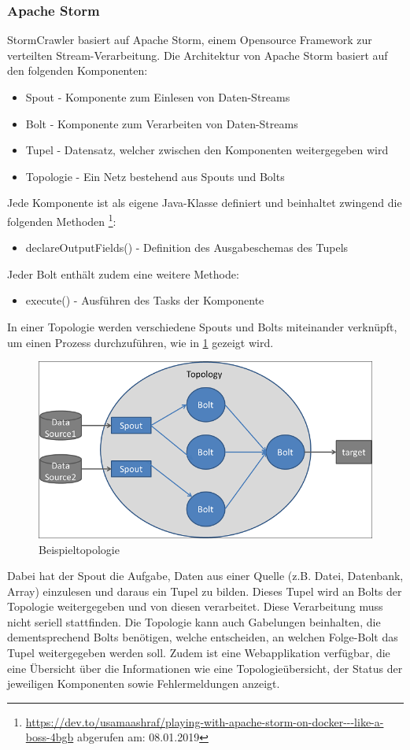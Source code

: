 \subsubsection{Apache Storm}
StormCrawler basiert auf Apache Storm, einem Opensource Framework zur verteilten Stream-Verarbeitung.
Die Architektur von Apache Storm basiert auf den folgenden Komponenten:
\begin{itemize}
	\item Spout - Komponente zum Einlesen von Daten-Streams
	\item Bolt - Komponente zum Verarbeiten von Daten-Streams
	\item Tupel - Datensatz, welcher zwischen den Komponenten weitergegeben wird
	\item Topologie - Ein Netz bestehend aus Spouts und Bolts
\end{itemize}
Jede Komponente ist als eigene Java-Klasse definiert und beinhaltet zwingend die folgenden Methoden \footnote{\url{https://dev.to/usamaashraf/playing-with-apache-storm-on-docker---like-a-boss-4bgb} abgerufen am: 08.01.2019}:
\begin{itemize}
	\item declareOutputFields() - Definition des Ausgabeschemas des Tupels
\end{itemize}
Jeder Bolt enthält zudem eine weitere Methode:
\begin{itemize}
	\item execute() - Ausführen des Tasks der Komponente
\end{itemize}
In einer Topologie werden verschiedene Spouts und Bolts miteinander verknüpft, um einen Prozess durchzuführen, wie in \cref{fig:topology} gezeigt wird.
\begin{figure}[H]
	\centering	
	\includegraphics[width=0.8\columnwidth,keepaspectratio]{img/storm-topology.png}
	\caption{Beispieltopologie}
	\label{fig:topology}
\end{figure}
Dabei hat der Spout die Aufgabe, Daten aus einer Quelle (z.B. Datei, Datenbank, Array) einzulesen und daraus ein Tupel zu bilden.
Dieses Tupel wird an Bolts der Topologie weitergegeben und von diesen verarbeitet.
Diese Verarbeitung muss nicht seriell stattfinden.
Die Topologie kann auch Gabelungen beinhalten, die dementsprechend Bolts benötigen, welche entscheiden, an welchen Folge-Bolt das Tupel weitergegeben werden soll.
Zudem ist eine Webapplikation verfügbar, die eine Übersicht über die Informationen wie eine Topologieübersicht, der Status der jeweiligen Komponenten sowie Fehlermeldungen anzeigt.
